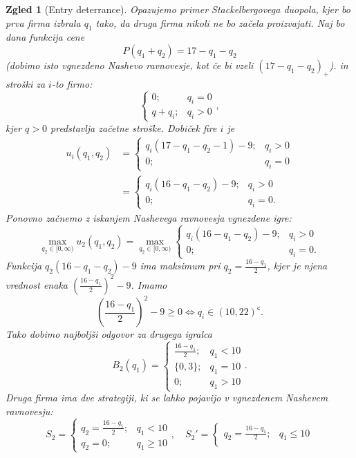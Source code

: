 \documentclass[10pt, a4paper]{article}
\newtheorem{zgled}[izr]{Zgled}
\newcommand{\stcomp}[1]{{#1}^{\mathsf{c}}}
\begin{document}
\begin{zgled}[Entry deterrance]
  Opazujemo primer Stackelbergovega duopola, kjer bo prva firma izbrala $q_1$ tako, da druga firma nikoli ne bo začela proizvajati.
  Naj bo dana funkcija cene 
  $$P(q_1 + q_2) = 17 - q_1 - q_2$$
  (dobimo isto vgnezdeno Nashevo ravnovesje, kot če bi vzeli $(17 - q_1 - q_2)_+$).
  in stroški za $i$-to firmo:
  $$\begin{cases}
    0;& q_i = 0\\
    q + q_i;& q_i > 0
  \end{cases},$$
  kjer $q > 0$ predstavlja začetne stroške.
  Dobiček fire $i$ je 
  \begin{align*}
    u_i (q_1, q_2) &= \begin{cases}
      q_i (17 - q_1 - q_2 - 1) - 9; & q_i > 0\\
      0;& q_i = 0
    \end{cases}\\
    &= \begin{cases}
      q_i (16 - q_1 - q_2) - 9;& q_i > 0\\
      0;& q_i = 0.
    \end{cases}
  \end{align*}
  Ponovno začnemo z iskanjem Nashevega ravnovesja vgnezdene igre:
  $$\max_{q_2 \in [0, \infty)} u_2(q_1, q_2) = \max_{q_2 \in [0, \infty)} \begin{cases}
    q_i (16 - q_1 - q_2) - 9;& q_i > 0\\
    0;& q_i = 0.
  \end{cases}$$
  Funkcija $q_2 (16 - q_1 - q_2) - 9$ ima maksimum pri $q_2 = \frac{16 - q_1}{2}$,
  kjer je njena vrednost enaka $\left(\frac{16 - q_1}{2}\right)^2 - 9$. Imamo 
  $$\left(\frac{16 - q_1}{2}\right)^2 - 9 \geq 0 \Leftrightarrow q_i \in \stcomp{(10, 22)}.$$
  Tako dobimo najboljši odgovor za drugega igralca
  $$B_2 (q_1) = \begin{cases}
    \frac{16 - q_1}{2};& q_1 < 10\\
    \{0, 3\};& q_1 = 10\\
    0;& q_1 > 10
  \end{cases}.$$
  Druga firma ima dve strategiji, ki se lahko pojavijo v vgnezdenem Nashevem ravnovesju:
  $$S_2 = \begin{cases}
    q_2 = \frac{16 - q_1}{2};& q_1 < 10\\
    q_2 = 0;& q_1 \geq 10
  \end{cases},\quad S_2' = \begin{cases}
    q_2 = \frac{16 - q_1}{2};& q_1 \leq 10\\

\end{cases}$$
\end{zgled}
\end{document}
